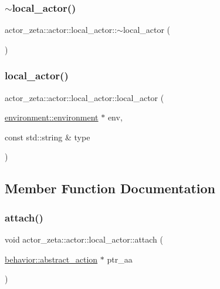 \subsubsection{\texorpdfstring{$\sim$local\+\_\+actor()}{~local\_actor()}}
{\footnotesize\ttfamily actor\+\_\+zeta\+::actor\+::local\+\_\+actor\+::$\sim$local\+\_\+actor (\begin{DoxyParamCaption}{ }\end{DoxyParamCaption})\hspace{0.3cm}{\ttfamily [virtual]}}

\mbox{\label{classactor__zeta_1_1actor_1_1local__actor_a10847f855f54d1dbc6f946c75b024cc7}} 
\subsubsection{\texorpdfstring{local\+\_\+actor()}{local\_actor()}}
{\footnotesize\ttfamily actor\+\_\+zeta\+::actor\+::local\+\_\+actor\+::local\+\_\+actor (\begin{DoxyParamCaption}\item[{\hyperlink{classactor__zeta_1_1environment_1_1environment}{environment\+::environment} $\ast$}]{env,  }\item[{const std\+::string \&}]{type }\end{DoxyParamCaption})\hspace{0.3cm}{\ttfamily [protected]}}



\subsection{Member Function Documentation}
\mbox{\label{classactor__zeta_1_1actor_1_1local__actor_a2a64a1b7c7d88cc1bb3b530edea07322}} 
\subsubsection{\texorpdfstring{attach()}{attach()}}
{\footnotesize\ttfamily void actor\+\_\+zeta\+::actor\+::local\+\_\+actor\+::attach (\begin{DoxyParamCaption}\item[{\hyperlink{classactor__zeta_1_1behavior_1_1abstract__action}{behavior\+::abstract\+\_\+action} $\ast$}]{ptr\+\_\+aa }\end{DoxyParamCaption})\hspace{0.3cm}{\ttfamily [protected]}}

